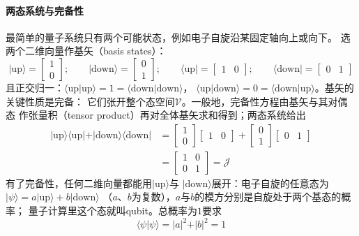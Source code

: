 \paragraph{两态系统与完备性}
最简单的量子系统只有两个可能状态，例如电子自旋沿某固定轴向上或向下。
选两个二维向量作基矢（basis states）：
\begin{equation*}
\vert\mathrm{up}\rangle=\begin{bmatrix}1\\0\end{bmatrix};\qquad
\vert\mathrm{down}\rangle=\begin{bmatrix}0\\1\end{bmatrix};\qquad
\langle\mathrm{up}\vert=\begin{bmatrix}1&0\end{bmatrix};\qquad
\langle\mathrm{down}\vert=\begin{bmatrix}0&1\end{bmatrix}
\end{equation*}
且正交归一：$\langle\mathrm{up}\vert\mathrm{up}\rangle=1=
\langle\mathrm{down}\vert\mathrm{down}\rangle$，
$\langle\mathrm{up}\vert\mathrm{down}\rangle=0=
\langle\mathrm{down}\vert\mathrm{up}\rangle$。基矢的关键性质是完备：
它们张开整个态空间$\mathcal{V}$。一般地，完备性方程由基矢与其对偶态
作张量积（tensor product）再对全体基矢求和得到；两态系统给出
\begin{align*}
\vert\mathrm{up}\rangle\langle\mathrm{up}\vert
+\vert\mathrm{down}\rangle\langle\mathrm{down}\vert
&=\begin{bmatrix}1\\0\end{bmatrix}\begin{bmatrix}1&0\end{bmatrix}
+\begin{bmatrix}0\\1\end{bmatrix}\begin{bmatrix}0&1\end{bmatrix}\\
&=\begin{bmatrix}1&0\\0&1\end{bmatrix}=\mathcal{J}
\tag{4.55}
\end{align*}
有了完备性，任何二维向量都能用$\vert\mathrm{up}\rangle$与
$\vert\mathrm{down}\rangle$展开：电子自旋的任意态为
$\vert\psi\rangle=a\vert\mathrm{up}\rangle+b\vert\mathrm{down}\rangle$
（$a$、$b$为复数），$a$与$b$的模方分别是自旋处于两个基态的概率；
量子计算里这个态就叫qubit。总概率为$1$要求
\begin{equation*}
\langle\psi\vert\psi\rangle=\vert a\vert^{2}+\vert b\vert^{2}=1
\tag{4.56}
\end{equation*}

